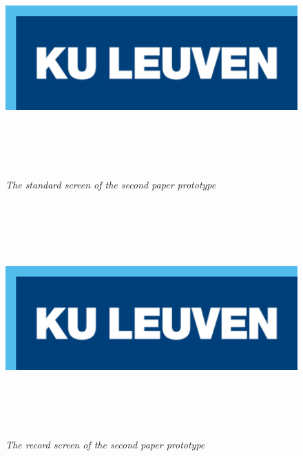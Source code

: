 \begin{figure}[H]
	\begin{center}
		\includegraphics[width=16cm, height=9cm]{KUL.png}
		\caption{\emph{The standard screen of the second paper prototype}}
		\label{The standard screen of the second paper prototype}
	\end{center}
\end{figure}

\begin{figure}[H]
	\begin{center}
		\includegraphics[width=16cm, height=9cm]{KUL.png}
		\caption{\emph{The record screen of the second paper prototype}}
		\label{The first paper prototype}
	\end{center}
\end{figure}

